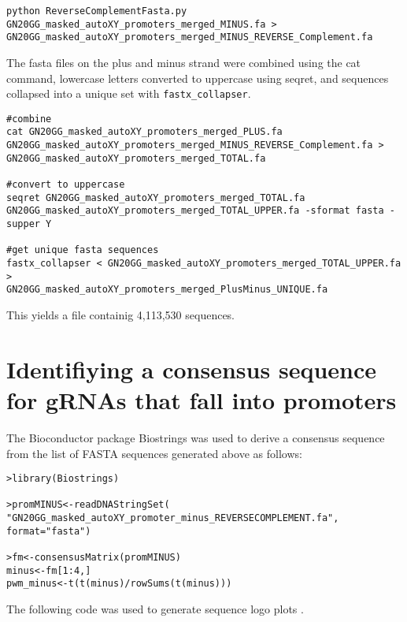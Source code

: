 \begin{lstlisting}
python ReverseComplementFasta.py GN20GG_masked_autoXY_promoters_merged_MINUS.fa >
GN20GG_masked_autoXY_promoters_merged_MINUS_REVERSE_Complement.fa
\end{lstlisting}

The fasta files on the plus and minus strand were combined using the cat command, lowercase letters converted to uppercase using seqret, and sequences collapsed into a unique set with \verb|fastx_collapser|. 

\begin{lstlisting}
#combine
cat GN20GG_masked_autoXY_promoters_merged_PLUS.fa 
GN20GG_masked_autoXY_promoters_merged_MINUS_REVERSE_Complement.fa >
GN20GG_masked_autoXY_promoters_merged_TOTAL.fa

#convert to uppercase 
seqret GN20GG_masked_autoXY_promoters_merged_TOTAL.fa 
GN20GG_masked_autoXY_promoters_merged_TOTAL_UPPER.fa -sformat fasta -supper Y   

#get unique fasta sequences
fastx_collapser < GN20GG_masked_autoXY_promoters_merged_TOTAL_UPPER.fa >
GN20GG_masked_autoXY_promoters_merged_PlusMinus_UNIQUE.fa

\end{lstlisting}

This yields a file containig 4,113,530 sequences.

\section{Identifiying a consensus sequence for gRNAs that fall into promoters}

The Bioconductor package Biostrings \cite{Biostrings} was used to derive a consensus sequence from the list of FASTA sequences generated above as follows:

\begin{lstlisting}
>library(Biostrings)

>promMINUS<-readDNAStringSet(
"GN20GG_masked_autoXY_promoter_minus_REVERSECOMPLEMENT.fa", format="fasta")  

>fm<-consensusMatrix(promMINUS) 
minus<-fm[1:4,] 
pwm_minus<-t(t(minus)/rowSums(t(minus)))  

\end{lstlisting}

The following code  was used to generate sequence logo plots \cite{Berry:2006hv}.

